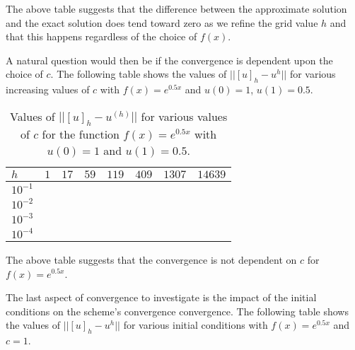 



The above table suggests that the difference between the approximate solution
and the exact solution does tend toward zero as we refine the grid value $h$ and
that this happens regardless of the choice of $f(x)$.

A natural question would then be if the convergence is dependent upon the choice
of $c$. The following table shows the values of $||[u]_h - u^{h}||$ for various
increasing values of $c$ with $f(x) = e^{0.5x}$ and $u(0) = 1$, $u(1) = 0.5$.

\begin{table}[h!]
  \centering
  \bgroup
  \def\arraystretch{1.5}
  \begin{tabular}{| l | c | c | c | c | c | c | c |}
    \hline
    $h$ & $1$ & $17$ & $59$ & $119$ & $409$ & $1307$ & $14639$\\
    \hline
    $10^{-1}$ & & & & & & & \\
    $10^{-2}$ & & & & & & & \\
    $10^{-3}$ & & & & & & & \\
    $10^{-4}$ & & & & & & & \\
    \hline
  \end{tabular}
  \egroup
  \caption{Values of $||[u]_h - u^{(h)}||$ for various values of $c$ for the function $f(x) = e^{0.5x}$ with $u(0) = 1$ and $u(1) = 0.5$.}
\end{table}

The above table suggests that the convergence is not dependent on $c$ for $f(x) = e^{0.5x}$.

The last aspect of convergence to investigate is the impact of the initial conditions
on the scheme's convergence convergence. The following table shows the values of $||[u]_h - u^{h}||$ for various
initial conditions with $f(x) = e^{0.5x}$ and $c=1$.

